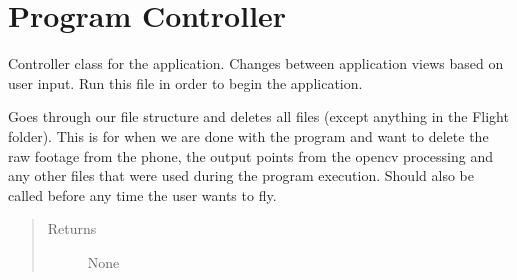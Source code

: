 \documentclass[letterpaper,10pt,english]{sphinxmanual}
\begin{document}
\chapter{Program Controller}
\label{\detokenize{index:module-src.Controllers.Program_Controller}}\label{\detokenize{index:program-controller}}

\begin{fulllineitems}
\label{\detokenize{index:src.Controllers.Program_Controller.Controller}}
Controller class for the application. Changes between application views based on user input.
Run this file in order to begin the application.

\begin{fulllineitems}
\label{\detokenize{index:src.Controllers.Program_Controller.Controller.cleanup}}
Goes through our file structure and deletes all files (except anything in the Flight folder).
This is for when we are done with the program and want to delete the raw footage from the phone,
the output points from the opencv processing and any other files that were used during the
program execution. Should also be called before any time the user wants to fly.
\begin{quote}\begin{description}
\item[{Returns}] \leavevmode
None

\end{description}\end{quote}

\end{fulllineitems}



\end{fulllineitems}
\end{document}
